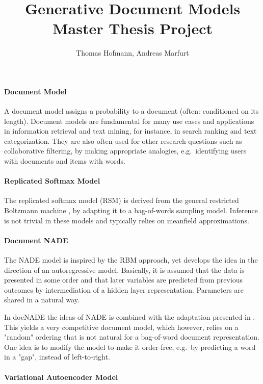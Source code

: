 \documentclass{article}
\author{Thomas Hofmann, Andreas Marfurt}
\title{Generative Document Models \\ Master Thesis Project}
\begin{document}
\maketitle

\paragraph{Document Model} A document model assigns a probability to a document (often: conditioned on its length). Document models are fundamental for many use cases and applications in information retrieval and text mining, for instance, in search ranking and text categorization. They are also often used for other research questions such as collaborative filtering, by making appropriate analogies, e.g.~identifying users with documents and items with words.  

\paragraph{Replicated Softmax Model}

The replicated softmax model (RSM) \cite{hinton2009replicated} is derived from the general restricted Boltzmann machine \cite{hinton2010practical}, by adapting it to a bag-of-words sampling model. Inference is not trivial in these models and typically relies on meanfield approximations.  

\paragraph{Document NADE}

The NADE model is inspired by the RBM approach, yet develops the idea in the direction of an autoregressive model. Basically, it is assumed that the data is presented in some order and that later variables are predicted from previous outcomes by intermediation of a hidden layer representation. Parameters are shared in a natural way.

In docNADE the ideas of NADE is combined with the adaptation presented in  \cite{hinton2009replicated}. This yields a very competitive document model, which however, relies on a "random" ordering that is not natural for a bag-of-word document representation. One idea is to modify the model to make it order-free, e.g.~by predicting a word in a "gap", instead of left-to-right. 

\paragraph{Variational Autoencoder Model} 
\end{document}
